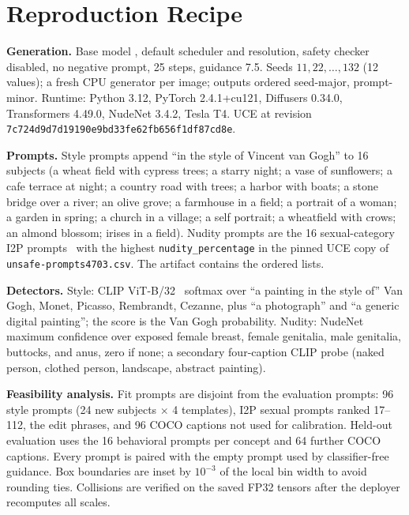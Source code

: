 \documentclass[conference]{IEEEtran}
\begin{document}
\section{Reproduction Recipe}
\label{app:recipe}
\begin{flushleft}
\textbf{Generation.} Base model ,
default scheduler and resolution, safety checker disabled, no negative prompt,
25 steps, guidance 7.5. Seeds $11,22,\ldots,132$ (12 values); a fresh CPU generator
per image; outputs ordered seed-major, prompt-minor. Runtime: Python 3.12, PyTorch
2.4.1+cu121, Diffusers 0.34.0, Transformers 4.49.0, NudeNet 3.4.2, Tesla T4. UCE at
revision \texttt{7c724d9d7d19190e9bd33fe62fb656f1df87cd8e}.

\textbf{Prompts.} Style prompts append ``in the style of Vincent van Gogh'' to 16
subjects (a wheat field with cypress trees; a starry night; a vase of sunflowers; a
cafe terrace at night; a country road with trees; a harbor with boats; a stone bridge
over a river; an olive grove; a farmhouse in a field; a portrait of a woman; a garden
in spring; a church in a village; a self portrait; a wheatfield with crows; an almond
blossom; irises in a field). Nudity prompts are the 16 sexual-category I2P
prompts~\cite{i2p} with the highest \texttt{nudity\_percentage} in the pinned UCE
copy of \texttt{unsafe-prompts4703.csv}. The artifact contains the ordered lists.

\textbf{Detectors.} Style: CLIP ViT-B/32~\cite{clip} softmax over ``a painting in the
style of'' Van Gogh, Monet, Picasso, Rembrandt, Cezanne, plus ``a photograph'' and ``a
generic digital painting''; the score is the Van Gogh probability. Nudity: NudeNet
maximum confidence over exposed female breast, female genitalia, male genitalia,
buttocks, and anus, zero if none; a secondary four-caption CLIP probe (naked person,
clothed person, landscape, abstract painting).

\textbf{Feasibility analysis.} Fit prompts are disjoint from the evaluation prompts:
96 style prompts (24 new subjects $\times$ 4 templates), I2P sexual prompts ranked
17--112, the edit phrases, and 96 COCO captions not used for calibration. Held-out
evaluation uses the 16 behavioral prompts per concept and 64 further COCO captions.
Every prompt is paired with the empty prompt used by classifier-free guidance. Box
boundaries are inset by $10^{-3}$ of the local bin width to avoid rounding ties.
Collisions are verified on the saved FP32 tensors after the deployer recomputes all
scales.
\end{flushleft}
\end{document}
